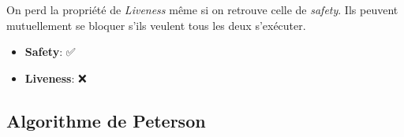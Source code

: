 On perd la propriété de \emph{Liveness} même si on retrouve celle de
\emph{safety}. Ils peuvent mutuellement se bloquer s'ils veulent tous
les deux s'exécuter.

\begin{itemize}
\tightlist
\item
  \textbf{Safety}: ✅
\item
  \textbf{Liveness}: ❌
\end{itemize}

\subsection{Algorithme de Peterson}\label{algorithme-de-peterson}

\begin{Shaded}
\begin{Highlighting}[]
\PreprocessorTok{ }
\PreprocessorTok{ }

\OperatorTok{=}\OperatorTok{;}
\OperatorTok{[];} 
\OperatorTok{[}\OperatorTok{]=}\OperatorTok{;}
\OperatorTok{[}\OperatorTok{]=}\OperatorTok{;}

\OperatorTok{[}\OperatorTok{]=}\OperatorTok{;} 
\OperatorTok{=}\OperatorTok{;} 
\OperatorTok{((}\OperatorTok{[}\OperatorTok{]==}\OperatorTok{)\&\&(}\OperatorTok{==}\OperatorTok{))} \OperatorTok{\{} 
\OperatorTok{\}} 
\OperatorTok{();}
\OperatorTok{[}\OperatorTok{]=}\OperatorTok{;}

\OperatorTok{[}\OperatorTok{]=}\OperatorTok{;} 
\OperatorTok{=}\OperatorTok{;} 
\OperatorTok{((}\OperatorTok{[}\OperatorTok{]==}\OperatorTok{)\&\&(}\OperatorTok{==}\OperatorTok{))} \OperatorTok{\{}
\OperatorTok{\}}
\OperatorTok{();}
\OperatorTok{[}\OperatorTok{]=}\OperatorTok{;}
\end{Highlighting}
\end{Shaded}

